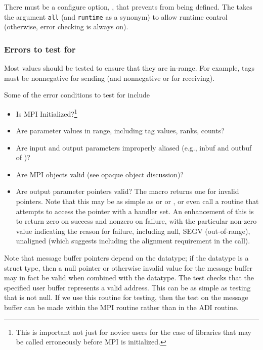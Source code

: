 \documentclass{article}
\begin{document}
There must be a configure option,
,  
that prevents  from being defined.  The
takes the argument \texttt{all} (and \texttt{runtime} as a synonym) to allow
runtime control (otherwise, error checking is always on).

\subsubsection{Errors to test for}
Most values should be tested to ensure that they are in-range.  For example,
tags must be nonnegative for sending (and nonnegative or
 for receiving). 

Some of the error conditions to test for include
\begin{itemize}
\item Is MPI Initialized?\footnote{This is important not just for
novice users for the case of libraries that may be called erroneously
before MPI is initialized.}
\item Are parameter values in range, including tag values, ranks, counts?
\item Are input and output parameters improperly aliased (e.g., inbuf and
  outbuf of   )?
\item Are MPI objects valid (see opaque object discussion)?
\item Are output parameter pointers valid?  The macro
   returns one for invalid pointers.
  Note that this may be as simple as  or
   or , or
  even call a routine that attempts to access the pointer with a
   handler set.  An enhancement of this is to return
zero on success and nonzero on failure, with the particular non-zero
value indicating the reason for failure, including null, SEGV
(out-of-range), unaligned (which suggests including the alignment
requirement in the call).
\end{itemize}
Note that message buffer pointers depend on the datatype; if the datatype is a
struct type, then a null pointer or otherwise invalid value for the message
buffer may in fact be valid when combined with the datatype.
The test  checks that the
specified user buffer represents a valid address.  This can be as simple as
testing that  is not null.  If we use
this routine for testing, then the test on the message buffer can be made
within the MPI routine rather than in the ADI routine.
\end{document}
